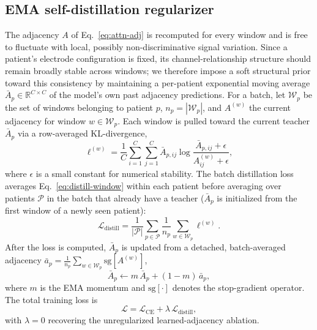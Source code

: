 \documentclass[letterpaper]{article}
\begin{document}
\subsection{EMA self-distillation regularizer}
\label{ssec:distill}

The adjacency $A$ of Eq.~\eqref{eq:attn-adj} is recomputed for every
window and is free to fluctuate with local, possibly non-discriminative
signal variation. Since a patient's electrode configuration is fixed, its
channel-relationship structure should remain broadly stable across windows;
we therefore impose a soft structural prior toward this consistency by
maintaining a per-patient exponential moving average
$\bar{A}_p \in \mathbb{R}^{C \times C}$ of the model's own past adjacency
predictions. For a batch, let
$\mathcal{W}_p$ be the set of windows belonging to patient $p$, $n_p =
|\mathcal{W}_p|$, and $A^{(w)}$ the current adjacency for window
$w \in \mathcal{W}_p$. Each window is pulled toward the current teacher
$\bar{A}_p$ via a row-averaged KL-divergence,
\begin{equation}
\ell^{(w)} = \frac{1}{C} \sum_{i=1}^{C} \sum_{j=1}^{C}
\bar{A}_{p,ij} \log \frac{\bar{A}_{p,ij} + \epsilon}{A^{(w)}_{ij} + \epsilon},
\label{eq:distill-window}
\end{equation}
where $\epsilon$ is a small constant for numerical stability. The batch
distillation loss averages Eq.~\eqref{eq:distill-window} within each
patient before averaging over  patients $\mathcal{P}$  in the
batch that already have a teacher ($\bar{A}_p$ is initialized from the first window of a newly seen patient):
\begin{equation}
\mathcal{L}_{\mathrm{distill}} = \frac{1}{|\mathcal{P}|} \sum_{p \in \mathcal{P}}
\frac{1}{n_p} \sum_{w \in \mathcal{W}_p} \ell^{(w)}.
\label{eq:distill}
\end{equation}
After the loss is computed, $\bar{A}_p$ is updated from a detached,
batch-averaged adjacency $\bar{a}_p = \frac{1}{n_p}\sum_{w \in \mathcal{W}_p} \mathrm{sg}[A^{(w)}]$,
\begin{equation}
\bar{A}_p \leftarrow m\,\bar{A}_p + (1-m)\,\bar{a}_p,
\label{eq:ema-update}
\end{equation}
where $m$ is the EMA momentum and $\mathrm{sg}[\cdot]$  denotes the stop-gradient operator.
The total training loss is
\begin{equation}
\mathcal{L} = \mathcal{L}_{\mathrm{CE}} + \lambda\, \mathcal{L}_{\mathrm{distill}},
\label{eq:total-loss}
\end{equation}
with $\lambda = 0$ recovering the unregularized learned-adjacency
ablation.
\end{document}

